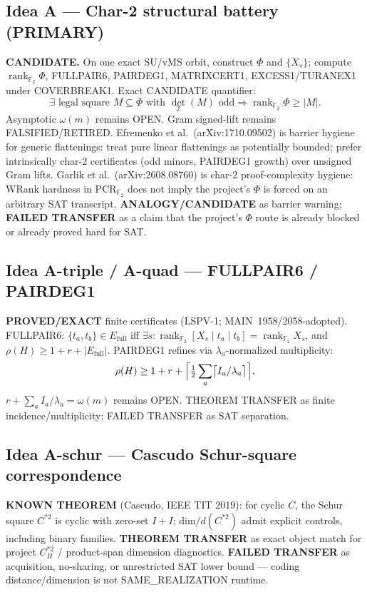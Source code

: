 \documentclass[11pt]{article}
\begin{document}
\subsection*{Idea A --- Char-2 structural battery (PRIMARY)}
\textbf{CANDIDATE.} On one exact SU/vMS orbit, construct $\Phi$ and $\{X_s\}$;
compute $\operatorname{rank}_{\mathbb F_2}\Phi$, FULLPAIR6, PAIRDEG1, MATRIXCERT1,
EXCESS1/TURANEX1 under COVERBREAK1. Exact CANDIDATE quantifier:
\[
\exists\text{ legal square }M\subseteq\Phi\text{ with }\det_{\mathbb Z}(M)\text{ odd}
\Rightarrow\operatorname{rank}_{\mathbb F_2}\Phi\ge|M|.
\]
Asymptotic $\omega(m)$ remains OPEN. Gram signed-lift remains FALSIFIED/RETIRED.
Efremenko et al.\ (arXiv:1710.09502) is barrier hygiene for generic flattenings:
treat pure linear flattenings as potentially bounded; prefer intrinsically
char-$2$ certificates (odd minors, PAIRDEG1 growth) over unsigned Gram lifts.
Garlik et al.\ (arXiv:2608.08760) is char-$2$ proof-complexity hygiene: WRank
hardness in PCR$_{\mathbb F_2}$ does not imply the project's $\Phi$ is forced on
an arbitrary SAT transcript.
\textbf{ANALOGY/CANDIDATE} as barrier warning; \textbf{FAILED TRANSFER} as a claim
that the project's $\Phi$ route is already blocked or already proved hard for SAT.

\subsection*{Idea A-triple / A-quad --- FULLPAIR6 / PAIRDEG1}
\textbf{PROVED/EXACT} finite certificates (LSPV-1; MAIN~1958/2058-adopted).
FULLPAIR6: $\{t_a,t_b\}\in E_{\mathrm{full}}$ iff $\exists s:
\operatorname{rank}_{\mathbb F_2}[X_s\mid t_a\mid t_b]=\operatorname{rank}_{\mathbb F_2}X_s$,
and $\rho(H)\ge 1+r+|E_{\mathrm{full}}|$. PAIRDEG1 refines via
$\lambda_a$-normalized multiplicity:
\[
\rho(H)\ge 1+r+\Bigl\lceil\tfrac12\sum_a\bigl\lceil I_a/\lambda_a\bigr\rceil\Bigr\rceil.
\]
$r+\sum_a I_a/\lambda_a=\omega(m)$ remains OPEN. THEOREM TRANSFER as finite
incidence/multiplicity; FAILED TRANSFER as SAT separation.

\subsection*{Idea A-schur --- Cascudo Schur-square correspondence}
\textbf{KNOWN THEOREM} (Cascudo, IEEE TIT 2019): for cyclic $C$, the Schur square
$C^{*2}$ is cyclic with zero-set $I+I$; dim$/d(C^{*2})$ admit explicit controls,
including binary families. \textbf{THEOREM TRANSFER} as exact object match for
project $C_H^{*2}$ / product-span dimension diagnostics.
\textbf{FAILED TRANSFER} as acquisition, no-sharing, or unrestricted SAT lower
bound --- coding distance/dimension is not SAME\_REALIZATION runtime.
\end{document}
